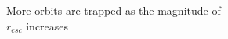 \documentclass[preview]{standalone}
\begin{document}
\begin{center}
More orbits are trapped as the magnitude of\\$r_{esc}$ increases
\end{center}
\end{document}
